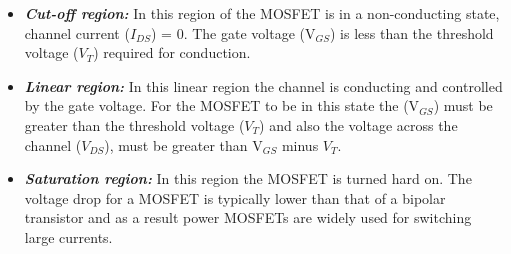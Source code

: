 	\begin{itemize}
		\item\textit{\textbf{Cut-off region:}} In this region of the MOSFET is in a non-conducting state, channel current ($I_{DS}$) = 0. The gate voltage (V$_{GS}$) is less than the threshold voltage ($V_{T}$) required for conduction.\label{itm:mosfet-cutoff-region}
		\item\textit{\textbf{Linear region:}} In this linear region the channel is conducting and controlled by the gate voltage. For the MOSFET to be in this state the (V$_{GS}$) must be greater than the threshold voltage ($V_{T}$) and also the voltage across the channel ($V_{DS}$), must be greater than V$_{GS}$ minus $V_{T}$.\label{itm:mosfet-linear-regior}
		\item\textit{\textbf{Saturation region:}} In this region the MOSFET is turned hard on. The voltage drop for a MOSFET is typically lower than that of a bipolar transistor and as a result power MOSFETs are widely used for switching large currents.\label{itm:mosfet-saturation-region}
	\end{itemize}

